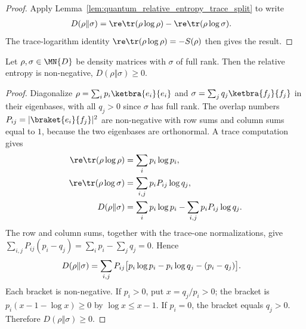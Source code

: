 \begin{proof}\leanok
    Apply Lemma~\ref{lem:quantum_relative_entropy_trace_split} to write
    \begin{align}
        D(\rho\Vert\sigma)
         & =\re\tr(\rho\log\rho)-\re\tr(\rho\log\sigma).
        \notag
    \end{align}
    The trace-logarithm identity $\re\tr(\rho\log\rho)=-S(\rho)$ then gives the
    result.
\end{proof}

\begin{theorem}\label{thm:klein_inequality}
    \leanok
    Let $\rho,\sigma\in\MN{D}$ be density matrices with $\sigma$ of full rank.
    Then the relative entropy is non-negative, $D(\rho\Vert\sigma)\ge0$.
\end{theorem}

\begin{proof}\leanok
    Diagonalize $\rho=\sum_i p_i\ketbra{e_i}{e_i}$ and
    $\sigma=\sum_j q_j\ketbra{f_j}{f_j}$ in their eigenbases, with all
    $q_j>0$ since $\sigma$ has full rank. The overlap numbers
    $P_{ij}=\lvert\braket{e_i}{f_j}\rvert^2$ are non-negative with row sums and
    column sums equal to $1$, because the two eigenbases are orthonormal. A trace
    computation gives
    \begin{align}
        \re\tr(\rho\log\rho)
         & =\sum_i p_i\log p_i,
        \notag                                              \\
        \re\tr(\rho\log\sigma)
         & =\sum_{i,j}p_iP_{ij}\log q_j,
        \notag                                              \\
        D(\rho\Vert\sigma)
         & =\sum_i p_i\log p_i-\sum_{i,j}p_iP_{ij}\log q_j.
        \notag
    \end{align}
    The row and column sums, together with the trace-one normalizations, give
    $\sum_{i,j}P_{ij}(p_i-q_j)=\sum_i p_i-\sum_jq_j=0$. Hence
    \begin{align}
        D(\rho\Vert\sigma)
         & =\sum_{i,j}P_{ij}
        \bigl[p_i\log p_i-p_i\log q_j-(p_i-q_j)\bigr].
        \notag
    \end{align}
    Each bracket is non-negative. If $p_i>0$, put $x=q_j/p_i>0$; the bracket
    is $p_i(x-1-\log x)\geq0$ by $\log x\leq x-1$. If $p_i=0$, the bracket
    equals $q_j>0$. Therefore $D(\rho\Vert\sigma)\geq0$.
\end{proof}

